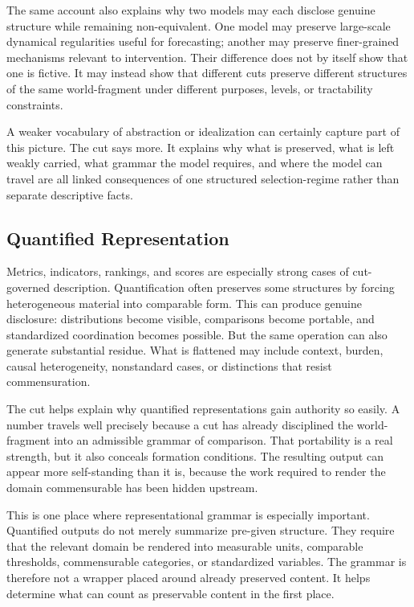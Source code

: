 \documentclass[11pt]{article}
\begin{document}
The same account also explains why two models may each disclose genuine structure while remaining non-equivalent. One model may preserve large-scale dynamical regularities useful for forecasting; another may preserve finer-grained mechanisms relevant to intervention. Their difference does not by itself show that one is fictive. It may instead show that different cuts preserve different structures of the same world-fragment under different purposes, levels, or tractability constraints.

A weaker vocabulary of abstraction or idealization can certainly capture part of this picture. The cut says more. It explains why what is preserved, what is left weakly carried, what grammar the model requires, and where the model can travel are all linked consequences of one structured selection-regime rather than separate descriptive facts.

\subsection{Quantified Representation}

Metrics, indicators, rankings, and scores are especially strong cases of cut-governed description. Quantification often preserves some structures by forcing heterogeneous material into comparable form. This can produce genuine disclosure: distributions become visible, comparisons become portable, and standardized coordination becomes possible. But the same operation can also generate substantial residue. What is flattened may include context, burden, causal heterogeneity, nonstandard cases, or distinctions that resist commensuration. \cite{espeland_stevens_quantification,merry_seductions_of_quantification,porter_trust_in_numbers}

The cut helps explain why quantified representations gain authority so easily. A number travels well precisely because a cut has already disciplined the world-fragment into an admissible grammar of comparison. That portability is a real strength, but it also conceals formation conditions. The resulting output can appear more self-standing than it is, because the work required to render the domain commensurable has been hidden upstream.

This is one place where representational grammar is especially important. Quantified outputs do not merely summarize pre-given structure. They require that the relevant domain be rendered into measurable units, comparable thresholds, commensurable categories, or standardized variables. The grammar is therefore not a wrapper placed around already preserved content. It helps determine what can count as preservable content in the first place.
\end{document}
